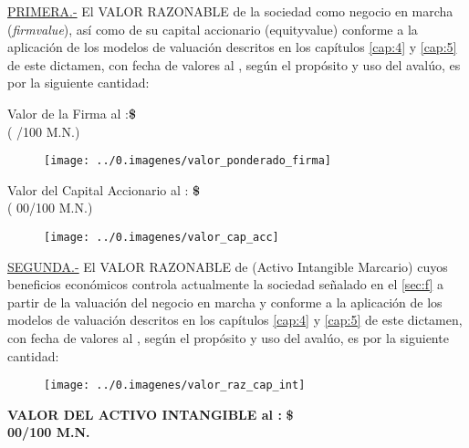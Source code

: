 \textcolor{principal}{\underline{PRIMERA.-}} El \textcolor{principal}{VALOR RAZONABLE} de la sociedad \textcolor{principal}{\empresaSolicitante} como negocio en marcha (\textit{\gls{firmvalue}}), as\'i como de su capital accionario (\gls{equityvalue}) conforme a la aplicaci\'on de los modelos de valuaci\'on descritos en los cap\'itulos \ref{cap:4} y \ref{cap:5} de este dictamen, con fecha de valores al \fechaValores, seg\'un el prop\'osito y uso del aval\'uo, es por la siguiente cantidad:\\
\begin{center}
\textcolor{principal}{Valor de la Firma al \fechaValoresCorto:}\textbf{\$\valorFirma{} \monedaCode}\\

(\textcolor{secundario}{\valorFirmaLetra{} /100 M.N.})

\begin{figure}[H]
\centering
\texttt{[image: ../0.imagenes/valor\_ponderado\_firma]}

\end{figure}


\textcolor{principal}{Valor del Capital Accionario al \fechaValoresCorto:} \textbf{\$\valorCapital{} \monedaCode}\\
(\textcolor{secundario}{\valorCapitalLetra{} \moneda{} 00/100 M.N.})\\
\end{center}

\begin{figure}[H]
\centering
\texttt{[image: ../0.imagenes/valor\_cap\_acc]}

\end{figure}
\espacio{.5cm}



\textcolor{principal}{\underline{SEGUNDA.-}} El \textcolor{principal}{VALOR RAZONABLE} de \textcolor{principal}{\marca{}} (Activo Intangible Marcario) cuyos beneficios econ\'omicos controla actualmente la sociedad \textcolor{principal}{\empresaSolicitante} se\~nalado en el \autoref{sec:f}  a partir de la valuaci\'on del negocio en marcha y conforme a la aplicaci\'on de los modelos de valuaci\'on descritos en los cap\'itulos \ref{cap:4} y \ref{cap:5} de este dictamen, con fecha de valores al \textcolor{principal}{\textbf{\fechaValores}}, seg\'un el prop\'osito y uso del aval\'uo, es por la siguiente cantidad:\\

\begin{center}
\begin{figure}[H]
\centering
	\texttt{[image: ../0.imagenes/valor\_raz\_cap\_int]}
\end{figure}

\textcolor{principal}{\textbf{VALOR DEL ACTIVO INTANGIBLE al \fechaValoresCorto:}} \textbf{\$\valorActivoIntangible{}  \monedaCode} \\


\textcolor{principal}{\textbf{\valorActivoIntangibleLetra{} \moneda{} 00/100 M.N.}}\\

\end{center}

\vspace{2cm}